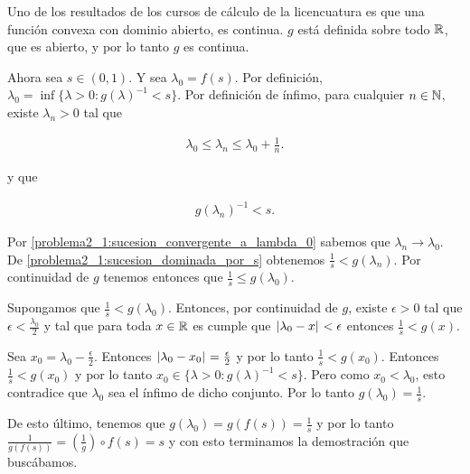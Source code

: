     Uno de los resultados de los cursos de cálculo de la licencuatura es que una función convexa con dominio abierto, es continua.
    $g$ está definida sobre todo $\mathbb{R}$, que es abierto, y por lo tanto $g$ es continua.\par\null
    
    Ahora sea $s \in (0,1)$. Y sea $\lambda_0 = f(s)$. Por definición, $\lambda_0 = \inf\{ \lambda > 0 : g(\lambda)^{-1} < s\}$. Por definición de ínfimo,
    para cualquier $n \in \mathbb{N}$, existe $\lambda_n > 0$ tal que 
    
    \begin{align}
        \lambda_0 \leq \lambda_n \leq \lambda_0 + \frac{1}{n}. \label{problema2_1:sucesion_convergente_a_lambda_0}
    \end{align}\par\null
     
    y que
    
    \begin{align}
        g(\lambda_n)^{-1} < s. \label{problema2_1:sucesion_dominada_por_s}
    \end{align}\par\null
    
    Por \eqref{problema2_1:sucesion_convergente_a_lambda_0} sabemos que $\lambda_n \rightarrow \lambda_0$.
    De \eqref{problema2_1:sucesion_dominada_por_s} obtenemos $\frac{1}{s} < g(\lambda_n)$. Por continuidad de $g$
    tenemos entonces que $\frac{1}{s} \leq g(\lambda_0)$.\par\null
    
    Supongamos que $\frac{1}{s} < g(\lambda_0)$. Entonces, por continuidad de $g$, existe $\epsilon > 0$ tal que
    $\epsilon < \frac{\lambda_0}{2}$ y tal que para toda $x \in \mathbb{R}$ es cumple que $\hspace{.25mm}\left|\lambda_0 - x\right|\hspace{.25mm} < \epsilon$ 
    entonces $\frac{1}{s} < g(x)$.\par\null
    
    Sea $x_0 = \lambda_0 - \frac{\epsilon}{2}$. Entonces $\hspace{.25mm}\left|\lambda_0 - x_0\right|\hspace{.25mm} = \frac{\epsilon}{2}$ y por lo tanto
    $\frac{1}{s}<g(x_0)$. Entonces $\frac{1}{s} < g(x_0)$ y por lo tanto $x_0 \in \{ \lambda > 0 : g(\lambda)^{-1} < s \}$.
    Pero como $x_0 < \lambda_0$, esto contradice que $\lambda_0$ sea el ínfimo de dicho conjunto. Por lo tanto
    $g(\lambda_0) = \frac{1}{s}$.\par\null
    
    De esto último, tenemos que $g(\lambda_0) = g(f(s)) = \frac{1}{s}$ y por lo tanto \\
    $\frac{1}{g(f(s))} = (\frac{1}{g}) \circ f (s) = s$ y con esto terminamos la demostración que buscábamos.\par\null
    
